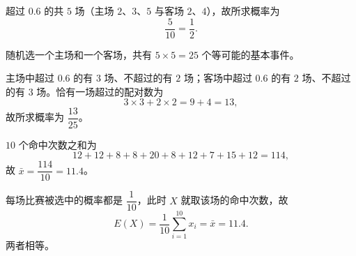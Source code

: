 \begin{answer}
超过 $0.6$ 的共 $5$ 场（主场 $2$、$3$、$5$ 与客场 $2$、$4$），故所求概率为
\nopagebreak[4]
\[\frac5{10}=\frac12 .\]


随机选一个主场和一个客场，共有 $5\times5=25$ 个等可能的基本事件。

主场中超过 $0.6$ 的有 $3$ 场、不超过的有 $2$ 场；客场中超过 $0.6$ 的有 $2$ 场、不超过的有 $3$ 场。恰有一场超过的配对数为
\nopagebreak[4]
\[3\times3+2\times2=9+4=13,\]
故所求概率为 $\dfrac{13}{25}$。


$10$ 个命中次数之和为
\nopagebreak[4]
\[12+12+8+8+20+8+12+7+15+12=114,\]
故 $\bar x=\dfrac{114}{10}=11.4$。

每场比赛被选中的概率都是 $\dfrac1{10}$，此时 $X$ 就取该场的命中次数，故
\nopagebreak[4]
\[E(X)=\frac1{10}\sum_{i=1}^{10}x_i=\bar x=11.4 .\]
两者相等。




\end{answer}

